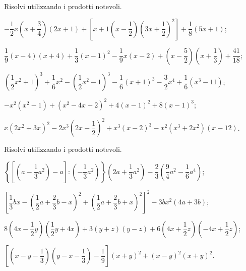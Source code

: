 \begin{esercizio}[\Ast]
 \label{ese:12.37}
Risolvi utilizzando i prodotti notevoli.
 \begin{enumeratea}
 \item $-{\dfrac{1}{2}x}\left(x+\dfrac{3}{4}\right)(2x+1)+\left[x+1\left(x-\dfrac{1}{2}\right)\left(3x+\dfrac{1}{2}\right)^{2}\right]+\dfrac{1}{8}(5x+1)$;
 \item $\dfrac{1}{9}(x-4)(x+4)+\dfrac{1}{3}(x-1)^{2}-\dfrac{1}{9}x(x-2)+\left(x-\dfrac{5}{2}\right)\left(x+\dfrac{1}{3}\right)+\dfrac{41}{18}$;
 \item $\left(\dfrac{1}{2}x^{2}+1\right)^{3}+\dfrac{1}{6}x^{2}-\left(\dfrac{1}{2}x^{2}-1\right)^{3}-\dfrac{1}{6}(x+1)^{3}-\dfrac{3}{2}x^{4}+\dfrac{1}{6}\left(x^3-11\right)$;
 \item $-x^{2}\left(x^{2}-1\right)+\left(x^{2}-4x+2\right)^{2}+4(x-1)^{2}+8(x-1)^{3}$;
 \item $x\left(2x^{2}+3x\right)^{2}-2x^{3}\left(2x-\dfrac{1}{2}\right)^{2}+x^{3}(x-2)^{3}-x^{2}\left(x^{3}+2x^{2}\right)(x-12)$.
 \end{enumeratea}
\end{esercizio}
\begin{esercizio}[\Ast]
 \label{ese:12.38}
Risolvi utilizzando i prodotti notevoli.
 \begin{enumeratea}
 \item $\left\lbrace\left[\left(a-\dfrac{1}{3}a^{2}\right)-a\right]:\left(-\dfrac{1}{3}a^{2}\right)\right\rbrace\left(2a+\dfrac{1}{3}a^{2}\right)-\dfrac{2}{3}\left(\dfrac{9}{4}a^{2}-\dfrac{1}{6}a^{4}\right)$;
 \item $\left[\dfrac{1}{3}bx-\left(\dfrac{1}{2}a+\dfrac{2}{3}b-x\right)^{2}+\left(\dfrac{1}{2}a+\dfrac{2}{3}b+x\right)^{2}\right]^{2}-3bx^{2}(4a+3b)$;
 \item $8\left(4x-\dfrac{1}{2}y\right)\left(\dfrac{1}{2}y+4x\right)+3(y+z)(y-z)+6\left(4x+\dfrac{1}{2}z\right)\left(-4x+\dfrac{1}{2}z\right)$;
 \item $\left[\left(x-y-\dfrac{1}{3}\right)\left(y-x-\dfrac{1}{3}\right)-\dfrac{1}{9}\right](x+y)^{2}+(x-y)^{2}(x+y)^{2}$.
 \end{enumeratea}
\end{esercizio}


